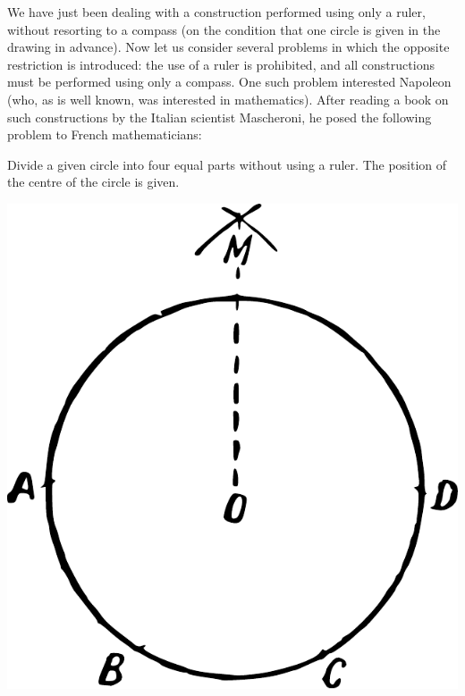 We have just been dealing with a construction performed using only a ruler, without resorting to a compass (on the condition that one circle is given in the drawing in advance). Now let us consider several problems in which the opposite restriction is introduced: the use of a ruler is prohibited, and all constructions must be performed using only a compass. One such problem interested Napoleon (who, as is well known, was interested in mathematics). After reading a book on such constructions by the Italian scientist Mascheroni, he posed the following problem to French mathematicians:

\ques Divide a given circle into four equal parts without using a ruler. The position of the centre of the circle is given.


\begin{marginfigure}%
\centering
\includegraphics[width=\textwidth]{figures/ch-10/fig-145.pdf}
\end{marginfigure}


